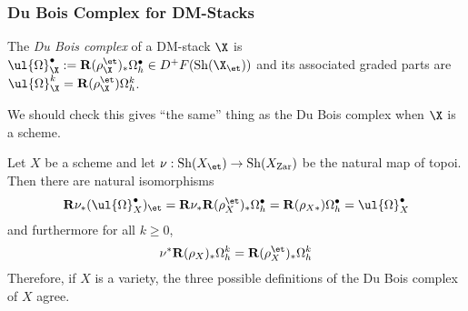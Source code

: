 \documentclass[12pt]{article}
\begin{document}
\subsubsection{Du Bois Complex for DM-Stacks}

\begin{defn}
The \textit{Du Bois complex} of a DM-stack $\X$ is $\ul{\Omega}^\bullet_{\X} := \R (\rho_{\X}^{\et})_* \Omega^\bullet_h \in D^+ F(\Sh(\X_{\et}))$ and its associated graded parts are $\ul{\Omega}_{\X}^k = \R (\rho_{\X}^{\et}) \Omega^k_h$.
\end{defn}

We should check this gives ``the same'' thing as the Du Bois complex when $\X$ is a scheme.

\begin{prop}
Let $X$ be a scheme and let $\nu : \Sh(X_{\et}) \to \Sh(X_{\Zar})$ be the natural map of topoi. Then there are natural isomorphisms
\[ \R \nu_* (\ul{\Omega}_{X}^\bullet)_{\et} = \R \nu_* \R (\rho_X^{\et})_* \Omega^\bullet_h = \R (\rho_{X *}) \Omega^\bullet_h = \ul{\Omega}_X^\bullet \]
and furthermore for all $k \ge 0$,
\[ \nu^* \R (\rho_X)_* \Omega^k_h = \R (\rho_{X}^\et)_* \Omega^k_h \]
Therefore, if $X$ is a variety, the three possible definitions of the Du Bois complex of $X$ agree. 
\end{prop}
\end{document}
